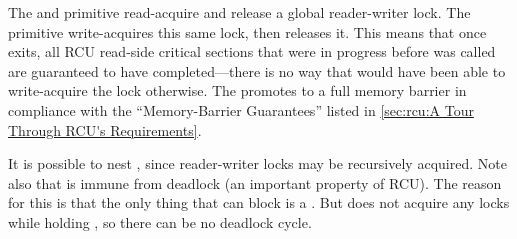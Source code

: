 The  and  primitive read-acquire
and release a global reader-writer lock.
The 
primitive write-acquires this same lock, then releases it.
This means
that once  exits, all RCU read-side critical sections
that were in progress before  was called are guaranteed
to have completed---there is no way that  would have
been able to write-acquire the lock otherwise.
The 
promotes  to a full memory barrier in compliance with
the ``Memory-Barrier Guarantees'' listed in
\cref{sec:rcu:A Tour Through RCU's Requirements}.

It is possible to nest , since reader-writer locks may
be recursively acquired.
Note also that  is immune
from deadlock (an important property of RCU\@).
The reason for this is
that the only thing that can block  is a .
But  does not acquire any locks while holding ,
so there can be no deadlock cycle.

